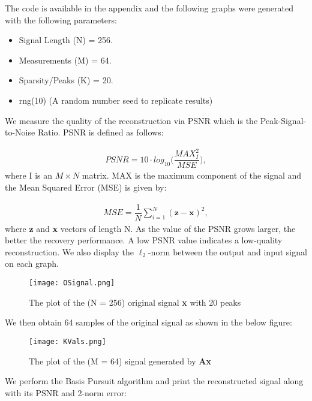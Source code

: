 \documentclass[titlepage,oneside, 12pt]{book}
\theoremstyle{break}
\begin{document}
The code is available in the appendix and the following graphs were generated with the following parameters:

\begin{itemize}
\item Signal Length (N) = 256.
\item Measurements (M) = 64. 
\item Sparsity/Peaks (K) = 20.
\item rng(10) (A random number seed to replicate results)
\end{itemize}

We measure the quality of the reconstruction via PSNR which is the Peak-Signal-to-Noise Ratio. PSNR is defined as follows:

\begin{equation}
\begin{gathered}
PSNR = 10 \cdot log_{10} \bigg(\dfrac{MAX_I^2}{MSE} \bigg), 
\end{gathered}
\end{equation}
where I is an $M \times N $ matrix. MAX is the maximum component of the signal and the Mean Squared Error (MSE) is given by: 

\begin{equation}
\begin{gathered}
MSE =  \dfrac{1}{N} \sum_{i=1}^{N} (\textbf{z} - \textbf{x})^2 ,
\end{gathered}
\end{equation}
where \textbf{z} and \textbf{x} vectors of length N. As the value of the PSNR grows larger, the better the recovery performance. A low PSNR value indicates a low-quality reconstruction. We also display the $\ell_2$-norm between the output and input signal on each graph. 


\begin{figure}[H]
\centering
\centerline{\texttt{[image: OSignal.png]}}
\caption{The plot of the (N = 256) original signal \textbf{x} with 20 peaks}
\label{fig:1DO}
\end{figure}

We then obtain 64 samples of the original signal as shown in the below figure:

\begin{figure}[H]
\centering
\centerline{\texttt{[image: KVals.png]}}
\caption{The plot of the (M = 64) signal generated by \textbf{Ax}}
\label{fig:1DK}
\end{figure}

We perform the Basis Pursuit algorithm and print the reconstructed signal along with its PSNR and 2-norm error:
\end{document}
